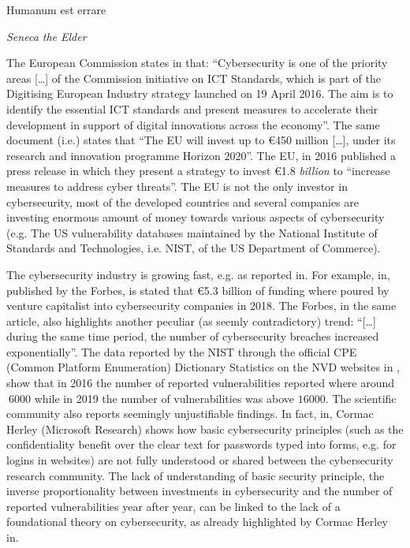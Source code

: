 \epigraph{Humanum est errare}{{\itshape Seneca the Elder}}
The European Commission states in\autocite{EU2019market} that: ``Cybersecurity
is one of the priority areas [\ldots] of the Commission initiative on ICT
Standards, which is part of the Digitising European
Industry\autocite{EU2019standard} strategy launched on 19 April 2016.  The aim
is to identify the essential ICT standards and present measures to accelerate
their development in support of digital innovations across the economy''. The
same document (i.e.\autocite{EU2019market}) states that ``The EU will invest up
to \euro450 million [\ldots], under its research and innovation programme
Horizon 2020''. The EU, in 2016 published a press release\autocite{EU2016press}
in which they present a strategy to invest \euro1.8 \emph{billion} to
``increase measures to address cyber threats''. The EU is not the only investor
in cybersecurity, most of the developed countries and several companies are
investing enormous amount of money towards various aspects of cybersecurity
(e.g. The US vulnerability databases\autocite{NIST2020NVD} maintained by the
National Institute of Standards and Technologies, i.e. NIST, of the US
Department of Commerce).

The cybersecurity industry is growing fast, e.g. as reported
in\autocite{Nasdaq2018market}. For example, in\autocite{Forbes2017market},
published by the Forbes, is stated that \euro5.3 billion of funding where
poured by venture capitalist into cybersecurity companies in 2018. The Forbes,
in the same article, also highlights another peculiar (as seemly contradictory)
trend: ``[\ldots] during the same time period, the number of cybersecurity
breaches increased exponentially''. The data reported by the NIST 
through the official CPE (Common Platform Enumeration) Dictionary Statistics 
on the NVD websites in \autocite{NIST2020CPEstatistics}, show that in 2016 the
number of reported vulnerabilities reported where around $~6000$ while in 2019
the number of vulnerabilities was above $16000$.  The scientific community also
reports seemingly unjustifiable findings.  In fact, in\autocite{Herley2009so}, Cormac Herley
(Microsoft Research) shows how basic cybersecurity principles (such as the
confidentiality benefit over the clear text for passwords typed into forms,
e.g. for logins in websites) are not fully understood or shared between the
cybersecurity research community\autocite{Nielsen2009stop}.  The lack of
understanding of basic security principle, the inverse proportionality between
investments in cybersecurity and the number of reported vulnerabilities year
after year, can be linked to the lack of a foundational theory on
cybersecurity, as already highlighted by Cormac Herley
in\autocite{Herley2016unfalsifiability}. 

